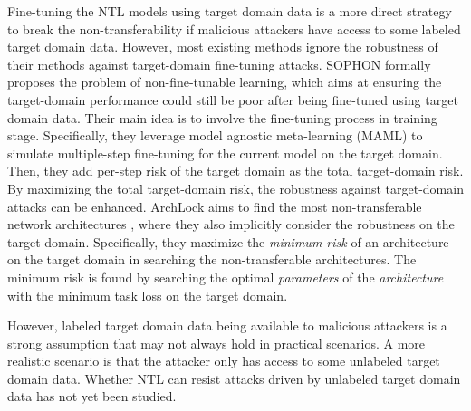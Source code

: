 Fine-tuning the NTL models using target domain data is a more direct strategy to break the non-transferability if malicious attackers have access to some labeled target domain data. However, most existing methods \cite{wang2021non,wang2023model,zeng2022unsupervised,wang2023domain,hong2024improving,peng2024map} ignore the robustness of their methods against target-domain fine-tuning attacks. SOPHON \cite{deng2024sophon} formally proposes the problem of non-fine-tunable learning, which aims at ensuring the target-domain performance could still be poor after being fine-tuned using target domain data.
Their main idea is to involve the fine-tuning process in training stage. 
Specifically, they leverage model agnostic meta-learning (MAML) \cite{finn2017model} to simulate multiple-step fine-tuning for the current model on the target domain. Then, they add per-step risk of the target domain as the total target-domain risk. By maximizing the total target-domain risk, the robustness against target-domain attacks can be enhanced. 
ArchLock \cite{zhou2024archlock} aims to find the most non-transferable network architectures \cite{liu2018darts,real2019regularized}, where they also implicitly consider the robustness on the target domain. Speciﬁcally, they maximize the \textit{minimum risk} of an architecture on the target domain in searching the non-transferable architectures. The minimum risk is found by searching the optimal \textit{parameters} of the \textit{architecture} with the minimum task loss on the target domain.
 
However, labeled target domain data being available to malicious attackers is a strong assumption that may not always hold in practical scenarios. A more realistic scenario is that the attacker only has access to some unlabeled target domain data. Whether NTL can resist attacks driven by unlabeled target domain data has not yet been studied. 

